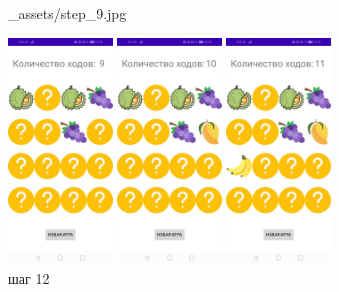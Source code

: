 \documentclass[12pt, a4paper, simple]{eskdtext}
\begin{document}
\begin{figure}[!h]
\begin{minipage}{0.15\textwidth}
                {_assets/step_9.jpg}
            \caption{шаг 9}
            \label{fig:step_9}
        \end{minipage}
        \begin{minipage}{0.15\textwidth}
            \centering
            \includegraphics[height=6cm]
                {_assets/step_10.jpg}
            \caption{шаг 10}
            \label{fig:step_10}
        \end{minipage}
        \begin{minipage}{0.15\textwidth}
            \centering
            \includegraphics[height=6cm]
                {_assets/step_11.jpg}
            \caption{шаг 11}
            \label{fig:step_11}
        \end{minipage}
        \begin{minipage}{0.15\textwidth}
            \centering
            \includegraphics[height=6cm]
                {_assets/step_12.jpg}
            \caption{шаг 12}
            \label{fig:step_12}
        \end{minipage}
    \end{figure}
\end{document}
